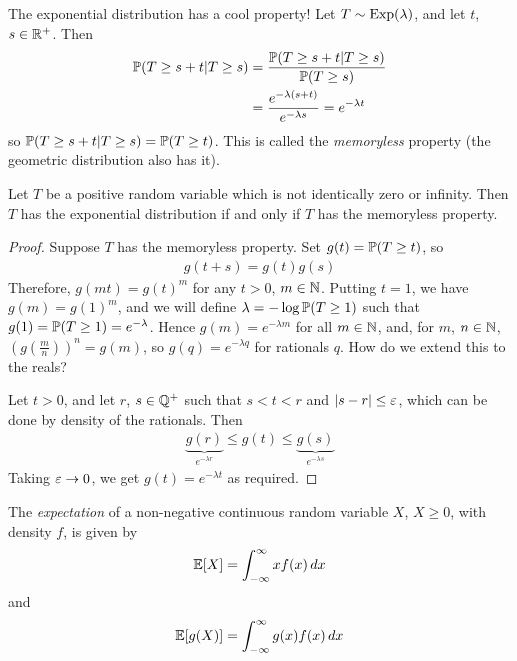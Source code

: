 \documentclass{../template/note}
\begin{document}
\begin{enumerate}[label=\protect\circled{\arabic*}]
        The exponential distribution has a cool property! Let \(T \sim \operatorname{Exp}(\lambda)\), and let \(t\), \(s \in \mathbb R^+\). Then
        \begin{align*}
            \mathbb P(T \geq s + t | T \geq s) &= \frac{\mathbb P(T \geq s + t | T \geq s)}{\mathbb P(T \geq s)} \\
            &= \frac{e^{-\lambda(s+t)}}{e^{-\lambda s}} = e^{-\lambda t}
        \end{align*}
        so \(\mathbb P(T \geq s + t | T \geq s) = \mathbb P(T \geq t)\). This is called the \emph{memoryless} property (the geometric distribution also has it).
    \end{enumerate}

    \begin{proposition}
        Let \(T\) be a positive random variable which is not identically zero or infinity. Then \(T\) has the exponential distribution if and only if \(T\) has the memoryless property.
    \end{proposition}
    
    \begin{proof}
        Suppose \(T\) has the memoryless property. Set \(g(t) = \mathbb P(T \geq t)\), so
        \begin{align*}
            g(t+s) = g(t)g(s)
        \end{align*}
        Therefore, \(g(mt) = g(t)^m\) for any \(t > 0\), \(m \in \mathbb N\). Putting \(t=1\), we have \(g(m) = g(1)^m\), and we will define \(\lambda = -\log \mathbb P(T \geq 1)\) such that \(g(1) = \mathbb P(T \geq 1) = e^{-\lambda}\). Hence \(g(m) = e^{-\lambda m}\) for all \(m \in \mathbb N\), and, for \(m\), \(n \in \mathbb N\), \(\left(g\left(\frac m n \right)\right)^n = g(m)\), so \(g(q) = e^{-\lambda q}\) for rationals \(q\). How do we extend this to the reals?
        
        Let \(t > 0\), and let \(r\), \(s \in \mathbb Q^+\) such that \(s < t < r\) and \(|s-r| \leq \varepsilon\), which can be done by density of the rationals. Then
        \begin{align*}
            \underbrace{g(r)}_{e^{-\lambda r}} \leq g(t) \leq \underbrace{g(s)}_{e^{-\lambda s}}
        \end{align*}
        Taking \(\varepsilon \to 0\), we get \(g(t) = e^{-\lambda t}\) as required.
    \end{proof}


    \begin{definition}
        The \emph{expectation} of a non-negative continuous random variable \(X\), \(X \geq 0\), with density \(f\), is given by
        \begin{align*}
            \mathbb E[X] = \int_{-\infty}^\infty xf(x) \,d{x}
        \end{align*}
        and
        \begin{align*}
            \mathbb E[g(X)] = \int_{-\infty}^\infty g(x)f(x) \,d{x}
        \end{align*}
    \end{definition}
    
\end{document}
